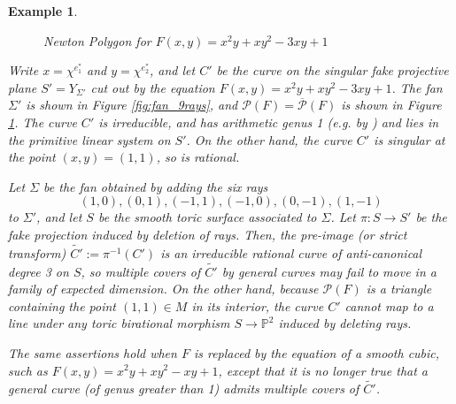 \documentclass[12pt]{amsart}
\def\P{\mathbb{P}}
\def\cP{\mathcal{P}}
\newtheorem{example}[definition]{Example}
\begin{document}
\begin{example}
\begin{figure}[H]
\begin{minipage}{0.45\textwidth}
        \caption{Newton Polygon for \( F(x,y) = x^2y + xy^2 - 3xy + 1 \)}\label{fig:fake_newton_polygon}
    \end{minipage}
\end{figure}

Write $x=\chi^{e_1^*}$ and $y=\chi^{e_2^*}$, and let $C'$ be the curve on the singular fake projective plane $S'=Y_{\Sigma'}$ cut out by the equation $F(x,y)=x^2y+xy^2-3xy+1$. The fan $\Sigma'$ is shown in Figure \ref{fig:fan_9rays}, and $\mathcal{P}(F)=\overline{\mathcal{P}}(F)$ is shown in Figure \ref{fig:fake_newton_polygon}. The curve $C'$ is irreducible, and has arithmetic genus 1 (e.g. by \cite[p. 91]{fulton_toric}) and lies in the primitive linear system on $S'$. On the other hand, the curve $C'$ is singular at the point $(x,y)=(1,1)$, so is rational.

Let $\Sigma$ be the fan obtained by adding the six rays 
\begin{equation*}
    (1,0),(0,1),(-1,1),(-1,0),(0,-1),(1,-1)
\end{equation*} 
to $\Sigma'$, and let $S$ be the smooth toric surface associated to $\Sigma$. Let $\pi:S\to S'$ be the fake projection induced by deletion of rays. Then, the pre-image (or strict transform) $\widetilde{C'}:=\pi^{-1}(C')$ is an irreducible rational curve of anti-canonical degree 3 on $S$, so multiple covers of $\widetilde{C'}$ by general curves may fail to move in a family of expected dimension. On the other hand, because $\cP(F)$ is a triangle containing the point $(1,1)\in M$ in its interior, the curve $C'$ cannot map to a line under any toric birational morphism $S\to \P^2$ induced by deleting rays.

The same assertions hold when $F$ is replaced by the equation of a smooth cubic, such as $F(x,y)=x^2y+xy^2-xy+1$, except that it is no longer true that a general curve (of genus greater than 1) admits multiple covers of $\widetilde{C'}$. 
\end{example}



 

\end{document}
